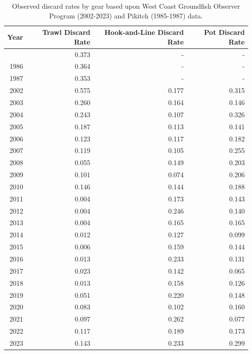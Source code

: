 \documentclass[
  english,
]{article}
\begin{document}
\begin{longtable}{rrrr}

\caption{\label{tbl-discard-rates}Observed discard rates by gear based
upon West Coast Groundfish Observer Program (2002-2023) and Pikitch
(1985-1987) data.}

\tabularnewline

\toprule
Year & Trawl Discard Rate & Hook-and-Line Discard Rate & Pot Discard Rate \\ 
\midrule\addlinespace[2.5pt]
1985 & 0.373 & - & - \\ 
1986 & 0.364 & - & - \\ 
1987 & 0.353 & - & - \\ 
2002 & 0.575 & 0.177 & 0.315 \\ 
2003 & 0.260 & 0.164 & 0.146 \\ 
2004 & 0.243 & 0.107 & 0.326 \\ 
2005 & 0.187 & 0.113 & 0.141 \\ 
2006 & 0.123 & 0.117 & 0.182 \\ 
2007 & 0.119 & 0.105 & 0.255 \\ 
2008 & 0.055 & 0.149 & 0.203 \\ 
2009 & 0.101 & 0.074 & 0.206 \\ 
2010 & 0.146 & 0.144 & 0.188 \\ 
2011 & 0.004 & 0.173 & 0.143 \\ 
2012 & 0.004 & 0.246 & 0.140 \\ 
2013 & 0.004 & 0.165 & 0.165 \\ 
2014 & 0.012 & 0.127 & 0.099 \\ 
2015 & 0.006 & 0.159 & 0.144 \\ 
2016 & 0.013 & 0.233 & 0.131 \\ 
2017 & 0.023 & 0.142 & 0.065 \\ 
2018 & 0.013 & 0.158 & 0.126 \\ 
2019 & 0.051 & 0.220 & 0.148 \\ 
2020 & 0.083 & 0.102 & 0.160 \\ 
2021 & 0.097 & 0.262 & 0.077 \\ 
2022 & 0.117 & 0.189 & 0.173 \\ 
2023 & 0.143 & 0.233 & 0.299 \\ 
\bottomrule

\end{longtable}

\endgroup

\pagebreak
\end{document}
